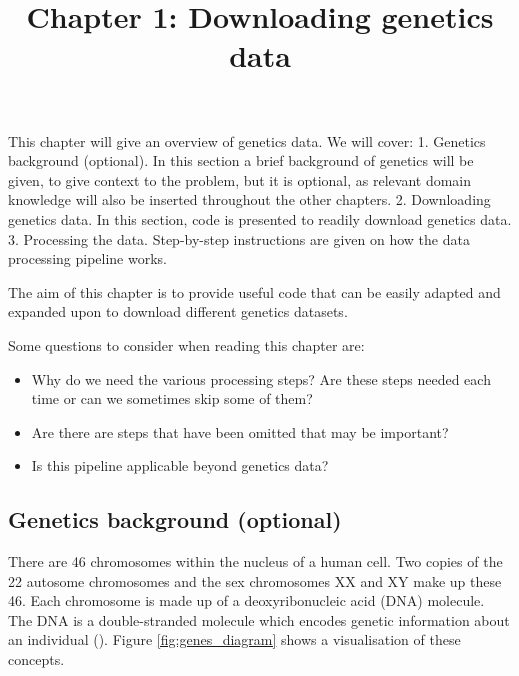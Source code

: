 \documentclass[
]{article}
\title{Chapter 1: Downloading genetics data}
\author{}
\date{\vspace{-2.5em}}
\providecommand{\tightlist}{%
  \setlength{\itemsep}{0pt}\setlength{\parskip}{0pt}}
\begin{document}
\maketitle

{
\setcounter{tocdepth}{2}
\tableofcontents
}
This chapter will give an overview of genetics data. We will cover: 1.
Genetics background (optional). In this section a brief background of
genetics will be given, to give context to the problem, but it is
optional, as relevant domain knowledge will also be inserted throughout
the other chapters. 2. Downloading genetics data. In this section, code
is presented to readily download genetics data. 3. Processing the data.
Step-by-step instructions are given on how the data processing pipeline
works.

The aim of this chapter is to provide useful code that can be easily
adapted and expanded upon to download different genetics datasets.

Some questions to consider when reading this chapter are:

\begin{itemize}
\tightlist
\item
  Why do we need the various processing steps? Are these steps needed
  each time or can we sometimes skip some of them?
\item
  Are there are steps that have been omitted that may be important?
\item
  Is this pipeline applicable beyond genetics data?
\end{itemize}

\subsection{Genetics background
(optional)}\label{genetics-background-optional}

There are 46 chromosomes within the nucleus of a human cell. Two copies
of the 22 autosome chromosomes and the sex chromosomes XX and XY make up
these 46. Each chromosome is made up of a deoxyribonucleic acid (DNA)
molecule. The DNA is a double-stranded molecule which encodes genetic
information about an individual (\cite{geneticsnotes}). Figure
\ref{fig:genes_diagram} shows a visualisation of these concepts.
\end{document}
